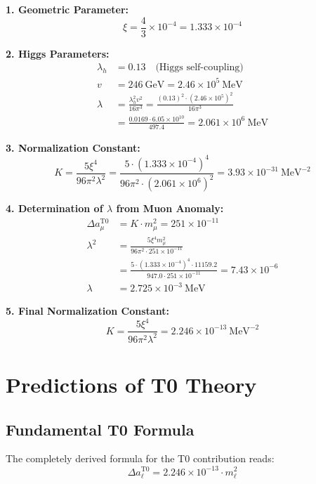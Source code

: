 \documentclass[12pt,a4paper]{article}
\theoremstyle{definition}
\begin{document}
	\begin{derivation}
		
		\textbf{1. Geometric Parameter:}
		\[
		\xi = \frac{4}{3} \times 10^{-4} = 1.333 \times 10^{-4}
		\]
		
		\textbf{2. Higgs Parameters:}
		\begin{align*}
			\lambda_h &= 0.13 \quad \text{(Higgs self-coupling)}\\
			v &= 246 \ \text{GeV} = 2.46 \times 10^5 \ \text{MeV}\\
			\lambda &= \frac{\lambda_h^2 v^2}{16\pi^3} = \frac{(0.13)^2 \cdot (2.46 \times 10^5)^2}{16\pi^3}\\
			&= \frac{0.0169 \cdot 6.05 \times 10^{10}}{497.4} = 2.061 \times 10^6 \ \text{MeV}
		\end{align*}
		
		\textbf{3. Normalization Constant:}
		\[
		K = \frac{5\xi^4}{96\pi^2\lambda^2} = \frac{5 \cdot (1.333 \times 10^{-4})^4}{96\pi^2 \cdot (2.061 \times 10^6)^2} = 3.93 \times 10^{-31} \ \text{MeV}^{-2}
		\]
		
		\textbf{4. Determination of $\lambda$ from Muon Anomaly:}
		\begin{align*}
			\Delta a_\mu^{\text{T0}} &= K \cdot m_\mu^2 = 251 \times 10^{-11}\\
			\lambda^2 &= \frac{5\xi^4 m_\mu^2}{96\pi^2 \cdot 251 \times 10^{-11}}\\
			&= \frac{5 \cdot (1.333 \times 10^{-4})^4 \cdot 11159.2}{947.0 \cdot 251 \times 10^{-11}} = 7.43 \times 10^{-6}\\
			\lambda &= 2.725 \times 10^{-3} \ \text{MeV}
		\end{align*}
		
		\textbf{5. Final Normalization Constant:}
		\[
		K = \frac{5\xi^4}{96\pi^2\lambda^2} = 2.246 \times 10^{-13} \ \text{MeV}^{-2}
		\]
	\end{derivation}
	
	\section{Predictions of T0 Theory}
	
	\subsection{Fundamental T0 Formula}
	
	The completely derived formula for the T0 contribution reads:
	\begin{equation}
		\Delta a_\ell^{\text{T0}} = 2.246 \times 10^{-13} \cdot m_\ell^2
		\label{eq:final_t0_formula}
	\end{equation}
	
\end{document}
